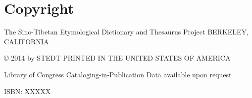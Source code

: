 \vspace{0.25em}
\chapter*{Copyright}

\centering
The Sino-Tibetan Etymological Dictionary and Thesaurus Project
BERKELEY, CALIFORNIA

© 2014 by STEDT
PRINTED IN THE UNITED STATES OF AMERICA

Library of Congress Cataloging-in-Publication Data available upon request

ISBN: XXXXX







